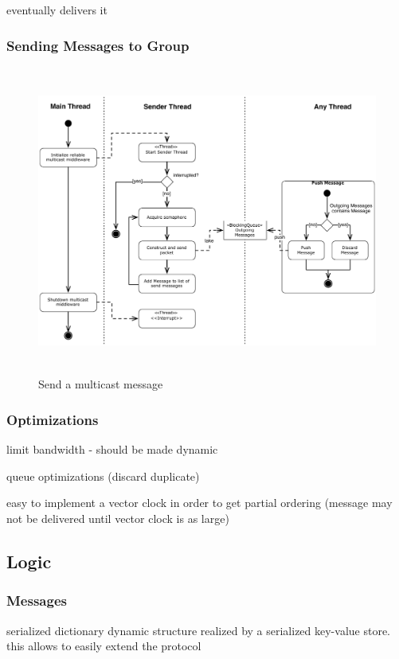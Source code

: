 eventually delivers it


\subsubsection{Sending Messages to Group}

\begin{figure}[htbp]
    \centering
        \includegraphics[height=4in]{figures/sendMessage.pdf}
    \caption{Send a multicast message}
    \label{fig:figures_processMessages}
\end{figure}

\subsubsection{Optimizations}

limit bandwidth 
    - should be made dynamic
    
queue optimizations (discard duplicate)

easy to implement a vector clock in order to get partial ordering  (message may not be delivered until vector clock is as large)

\subsection{Logic}

    
    \subsubsection{Messages}
    serialized dictionary
    dynamic structure realized by a serialized key-value store. 
    this allows to easily extend the protocol


